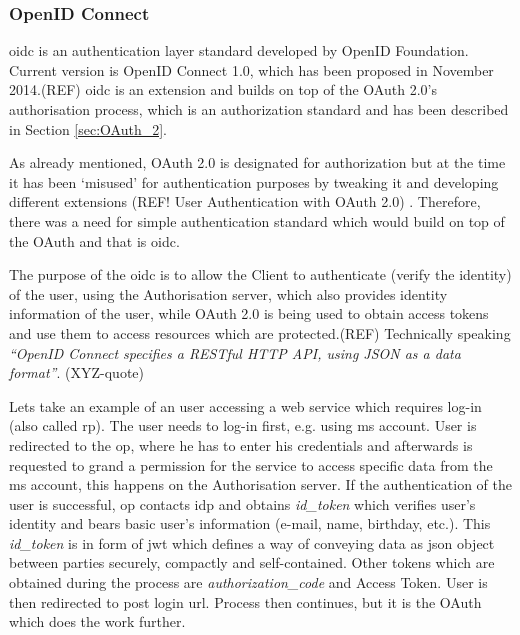 \subsubsection{OpenID Connect}

\acrfull{oidc} is an authentication layer standard developed by OpenID Foundation. Current version is OpenID Connect 1.0, which has been proposed in November 2014.(REF) \acrshort{oidc} is an extension and builds on top of the OAuth 2.0’s authorisation process, which is an authorization standard and has been described in Section \ref{sec:OAuth_2}. 

As already mentioned, OAuth 2.0 is designated for authorization but at the time it has been ‘misused’ for authentication purposes by tweaking it and developing different extensions (REF! User Authentication with OAuth 2.0) . Therefore, there was a need for simple authentication standard which would build on top of the OAuth and that is \acrshort{oidc}.

The purpose of the \acrshort{oidc} is to allow the Client to authenticate (verify the identity) of the user, using the Authorisation server, which also provides identity information of the user, while OAuth 2.0 is being used to obtain access tokens and use them to access resources which are protected.(REF) Technically speaking \textit{“OpenID Connect specifies a RESTful HTTP API, using JSON as a data format”}.  (XYZ-quote)

Lets take an example of an user accessing a web service which requires log-in (also called \acrfull{rp}). The user needs to log-in first, e.g. using \acrfull{ms} account. User is redirected to the \acrfull{op}, where he has to enter his credentials and afterwards is requested to grand a permission for the service to access specific data from the \acrshort{ms} account, this happens on the Authorisation server. If the authentication of the user is successful, \acrshort{op} contacts \acrfull{idp} and obtains \textit{id\_token} which verifies user’s identity and bears basic user’s information (e-mail, name, birthday, etc.). This \textit{id\_token} is in form of \acrfull{jwt} which defines a way of conveying data as \acrshort{json} object between parties securely, compactly and self-contained. Other tokens which are obtained during the process are \textit{authorization\_code} and Access Token. User is then redirected to post login \acrshort{url}. Process then continues, but it is the OAuth which does the work further.